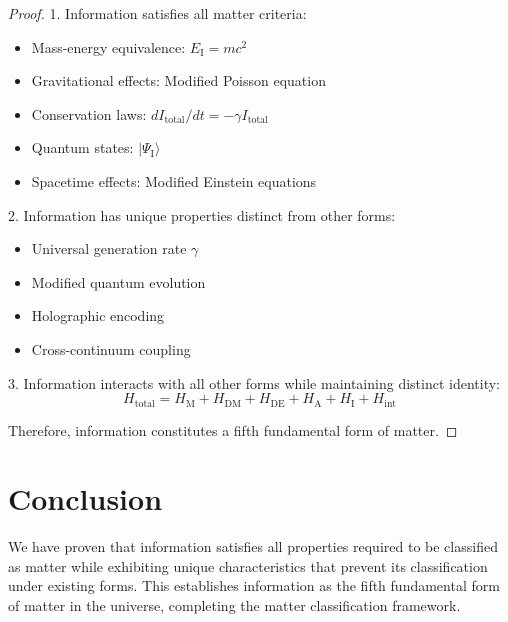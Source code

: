 \documentclass{article}
\begin{document}
\begin{proof}
1. Information satisfies all matter criteria:
   \begin{itemize}
      \item Mass-energy equivalence: $E_\text{I} = mc^2$
      \item Gravitational effects: Modified Poisson equation
      \item Conservation laws: $dI_\text{total}/dt = -\gamma I_\text{total}$
      \item Quantum states: $|\Psi_\text{I}\rangle$
      \item Spacetime effects: Modified Einstein equations
   \end{itemize}

2. Information has unique properties distinct from other forms:
   \begin{itemize}
      \item Universal generation rate $\gamma$
      \item Modified quantum evolution
      \item Holographic encoding
      \item Cross-continuum coupling
   \end{itemize}

3. Information interacts with all other forms while maintaining distinct identity:
\begin{equation}
H_\text{total} = H_\text{M} + H_\text{DM} + H_\text{DE} + H_\text{A} + H_\text{I} + H_\text{int}
\end{equation}

Therefore, information constitutes a fifth fundamental form of matter.
\end{proof}

\section{Conclusion}

We have proven that information satisfies all properties required to be classified as matter while exhibiting unique characteristics that prevent its classification under existing forms. This establishes information as the fifth fundamental form of matter in the universe, completing the matter classification framework.
\end{document}
